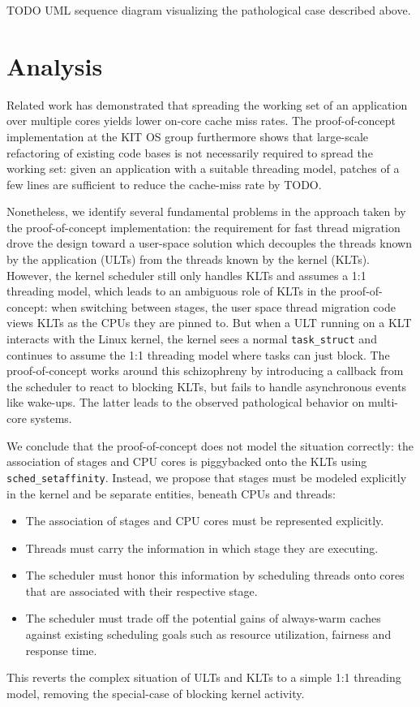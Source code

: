 \documentclass[12pt,a4paper]{book}
\begin{document}
TODO UML sequence diagram visualizing the pathological case described above.

\chapter{Analysis}\label{ch:analysis}
Related work has demonstrated that spreading the working set of an application over multiple cores yields lower on-core cache miss rates.
The proof-of-concept implementation at the KIT OS group furthermore shows that large-scale refactoring of existing code bases is not necessarily required to spread the working set:
given an application with a suitable threading model, patches of a few lines are sufficient to reduce the cache-miss rate by TODO.

Nonetheless, we identify several fundamental problems in the approach taken by the proof-of-concept implementation:
the requirement for fast thread migration drove the design toward a user-space solution which decouples the threads known by the application (ULTs) from the threads known by the kernel (KLTs).
However, the kernel scheduler still only handles KLTs and assumes a 1:1 threading model, which leads to an ambiguous role of KLTs in the proof-of-concept:
when switching between stages, the user space thread migration code views KLTs as the CPUs they are pinned to.
But when a ULT running on a KLT interacts with the Linux kernel, the kernel sees a normal \texttt{task\_struct} and continues to assume the 1:1 threading model where tasks can just block.
The proof-of-concept works around this schizophreny by introducing a callback from the scheduler to react to blocking KLTs, but fails to handle asynchronous events like wake-ups.
The latter leads to the observed pathological behavior on multi-core systems.

We conclude that the proof-of-concept does not model the situation correctly: the association of stages and CPU cores is piggybacked onto the KLTs using \texttt{sched\_setaffinity}.
Instead, we propose that stages must be modeled explicitly in the kernel and be separate entities, beneath CPUs and threads:
\begin{itemize}%
    \item The association of stages and CPU cores must be represented explicitly.
    \item Threads must carry the information in which stage they are executing.
    \item The scheduler must honor this information by scheduling threads onto cores that are associated with their respective stage.
    \item The scheduler must trade off the potential gains of always-warm caches against existing scheduling goals such as resource utilization, fairness and response time.
\end{itemize}%
This reverts the complex situation of ULTs and KLTs to a simple 1:1 threading model, removing the special-case of blocking kernel activity.
\end{document}
